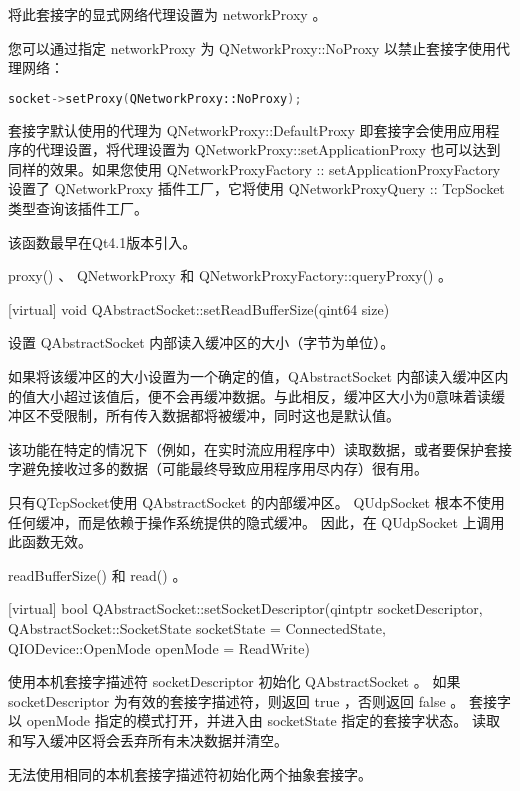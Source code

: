 将此套接字的显式网络代理设置为 networkProxy 。

您可以通过指定 networkProxy 为 QNetworkProxy::NoProxy 以禁止套接字使用代理网络：


\begin{lstlisting}[language=C++]
socket->setProxy(QNetworkProxy::NoProxy);
\end{lstlisting} 


套接字默认使用的代理为 QNetworkProxy::DefaultProxy 即套接字会使用应用程序的代理设置，将代理设置为 QNetworkProxy::setApplicationProxy 也可以达到同样的效果。如果您使用 QNetworkProxyFactory :: setApplicationProxyFactory 设置了 QNetworkProxy 插件工厂，它将使用 QNetworkProxyQuery :: TcpSocket 类型查询该插件工厂。

该函数最早在Qt4.1版本引入。


\begin{notice}[另请查阅]
proxy() 、 QNetworkProxy 和 QNetworkProxyFactory::queryProxy() 。
\end{notice}


[virtual] void QAbstractSocket::setReadBufferSize(qint64 size)

设置 QAbstractSocket 内部读入缓冲区的大小（字节为单位）。

如果将该缓冲区的大小设置为一个确定的值，QAbstractSocket 内部读入缓冲区内的值大小超过该值后，便不会再缓冲数据。与此相反，缓冲区大小为0意味着读缓冲区不受限制，所有传入数据都将被缓冲，同时这也是默认值。

该功能在特定的情况下（例如，在实时流应用程序中）读取数据，或者要保护套接字避免接收过多的数据（可能最终导致应用程序用尽内存）很有用。

只有QTcpSocket使用 QAbstractSocket 的内部缓冲区。 QUdpSocket 根本不使用任何缓冲，而是依赖于操作系统提供的隐式缓冲。 因此，在 QUdpSocket 上调用此函数无效。


\begin{notice}[另请查阅]
readBufferSize() 和 read()  。
\end{notice}

[virtual] bool QAbstractSocket::setSocketDescriptor(qintptr
socketDescriptor, QAbstractSocket::SocketState socketState =
ConnectedState, QIODevice::OpenMode openMode = ReadWrite)

使用本机套接字描述符 socketDescriptor 初始化 QAbstractSocket 。 如果 socketDescriptor 为有效的套接字描述符，则返回 true ，否则返回 false 。 套接字以 openMode 指定的模式打开，并进入由 socketState 指定的套接字状态。 读取和写入缓冲区将会丢弃所有未决数据并清空。

\begin{notice}
 无法使用相同的本机套接字描述符初始化两个抽象套接字。
\end{notice}

